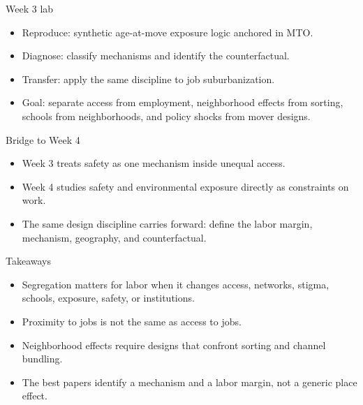 \documentclass[aspectratio=169,11pt]{beamer}
\begin{document}
\begin{frame}{Week 3 lab}
\begin{itemize}
    \item Reproduce: synthetic age-at-move exposure logic anchored in MTO.
    \item Diagnose: classify mechanisms and identify the counterfactual.
    \item Transfer: apply the same discipline to job suburbanization.
    \item Goal: separate access from employment, neighborhood effects from sorting, schools from neighborhoods, and policy shocks from mover designs.
\end{itemize}
\end{frame}

\begin{frame}{Bridge to Week 4}
\begin{itemize}
    \item Week 3 treats safety as one mechanism inside unequal access.
    \item Week 4 studies safety and environmental exposure directly as constraints on work.
    \item The same design discipline carries forward: define the labor margin, mechanism, geography, and counterfactual.
\end{itemize}
\end{frame}

\begin{frame}{Takeaways}
\begin{itemize}
    \item Segregation matters for labor when it changes access, networks, stigma, schools, exposure, safety, or institutions.
    \item Proximity to jobs is not the same as access to jobs.
    \item Neighborhood effects require designs that confront sorting and channel bundling.
    \item The best papers identify a mechanism and a labor margin, not a generic place effect.
\end{itemize}
\end{frame}
\end{document}
